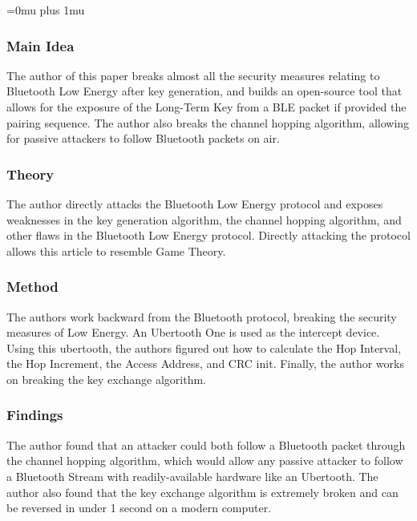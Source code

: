 \Urlmuskip=0mu plus 1mu\relax

\subsubsection{Main Idea}

\noindent
The author of this paper breaks almost all the security measures relating to Bluetooth Low Energy after key generation, and builds an open-source tool that allows for the exposure of the Long-Term Key from a BLE packet if provided the pairing sequence.  The author also breaks the channel hopping algorithm, allowing for passive attackers to follow Bluetooth packets on air.

\subsubsection{Theory}

\noindent
The author directly attacks the Bluetooth Low Energy protocol and exposes weaknesses in the key generation algorithm, the channel hopping algorithm, and other flaws in the Bluetooth Low Energy protocol.  Directly attacking the protocol allows this article to resemble Game Theory.

\subsubsection{Method}

\noindent
The authors work backward from the Bluetooth protocol, breaking the security measures of Low Energy.  An Ubertooth One is used as the intercept device.  Using this ubertooth, the authors figured out how to calculate the Hop Interval, the Hop Increment, the Access Address, and CRC init.  Finally, the author works on breaking the key exchange algorithm.

\subsubsection{Findings}

\noindent
The author found that an attacker could both follow a Bluetooth packet through the channel hopping algorithm, which would allow any passive attacker to follow a Bluetooth Stream with readily-available hardware like an Ubertooth.  The author also found that the key exchange algorithm is extremely broken and can be reversed in under 1 second on a modern computer.

